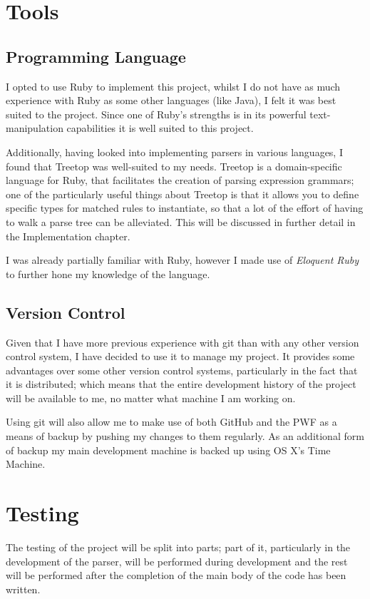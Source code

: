 \section{Tools}
  \subsection{Programming Language}
    I opted to use Ruby to implement this project, whilst I do not have as much
    experience with Ruby as some other languages (like Java), I felt it was best
    suited to the project. Since one of Ruby's strengths is in its powerful
    text-manipulation capabilities it is well suited to this project.

    Additionally, having looked into implementing parsers in various languages,
    I found that Treetop\cite{website:treetop} was well-suited to my needs.
    Treetop is a domain-specific language for Ruby, that facilitates the
    creation of parsing expression grammars; one of the particularly useful
    things about Treetop is that it allows you to define specific types for
    matched rules to instantiate, so that a lot of the effort of having to walk
    a parse tree can be alleviated. This will be discussed in further detail in
    the Implementation chapter.

    I was already partially familiar with Ruby, however I made use of
    \emph{Eloquent Ruby}\cite{book:eloquent_ruby} to further hone my knowledge
    of the language.
  \subsection{Version Control}
    Given that I have more previous experience with git than with any other
    version control system, I have decided to use it to manage my project. It
    provides some advantages over some other version control systems,
    particularly in the fact that it is distributed; which means that the entire
    development history of the project will be available to me, no matter what
    machine I am working on.

    Using git will also allow me to make use of both GitHub and the PWF as a
    means of backup by pushing my changes to them regularly. As an additional
    form of backup my main development machine is backed up using OS X's Time
    Machine.

\section{Testing}
The testing of the project will be split into parts; part of it, particularly
in the development of the parser, will be performed during development and the
rest will be performed after the completion of the main body of the code has
been written.

